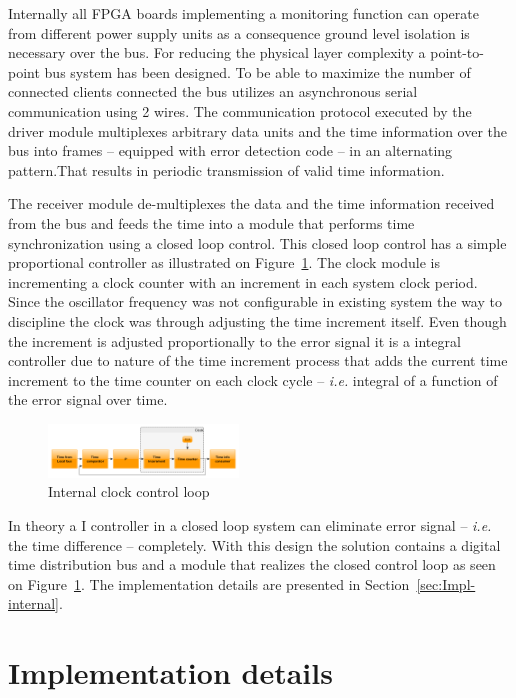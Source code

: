 \documentclass[article]{IEEEtran}
\begin{document}
Internally all FPGA boards implementing a monitoring function can operate from different power supply units as a consequence ground level
isolation is necessary over the bus. For reducing the physical layer complexity
a point-to-point bus system has been designed. To be able to maximize the number of connected clients connected the
bus utilizes an asynchronous serial communication using 2 wires. The communication protocol executed by the driver module
multiplexes arbitrary data units and the time information over the bus into frames -- equipped with error detection code --
in an alternating pattern.That results in periodic transmission of valid time information.

The receiver module de-multiplexes the data and the time information received from the bus and feeds the time into a module that
performs time synchronization using a closed loop control.
This closed loop control has a simple proportional controller as illustrated on Figure~\ref{fig:closed-loop}. The clock module
is incrementing a clock counter with an increment in each system clock period. Since the oscillator frequency was not configurable in 
existing system the way to discipline the clock was through adjusting the time increment itself.
Even though the increment is adjusted proportionally to the error signal it is a integral controller due to nature of 
the time increment process that adds the current time increment to the time counter on each clock cycle 
-- \emph{i.e.} integral of a function of the error signal over time.

\begin{figure}[H]
    \centering
    \includegraphics[width=0.45\textwidth]{figures_raw/time_control_loop.png}
    \caption{Internal clock control loop}
    \label{fig:closed-loop}
\end{figure}

In theory a I controller in a closed loop system can eliminate error signal -- \emph{i.e.} the time difference -- completely.
With this design the solution contains a digital time distribution bus and a module that realizes the 
closed control loop as seen on Figure~\ref{fig:closed-loop}. The implementation details are presented in Section~\ref{sec:Impl-internal}. 

\section{Implementation details}\label{sec:Impl}
\end{document}
